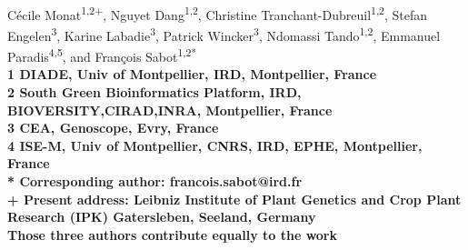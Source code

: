 \documentclass[10pt,letterpaper]{article}
\begin{document}
\vspace*{0.35in}

\begin{flushleft}
{\Large
\textbf{}
}
\newline
\\
Cécile Monat\textsuperscript{1,2{+}\textdagger},
Nguyet Dang\textsuperscript{1,2\textdagger},
Christine Tranchant-Dubreuil\textsuperscript{1,2\textdagger},
Stefan Engelen\textsuperscript{3},
Karine Labadie\textsuperscript{3},
Patrick Wincker\textsuperscript{3},
Ndomassi Tando\textsuperscript{1,2},
Emmanuel Paradis\textsuperscript{4,5},
and François Sabot\textsuperscript{1,2*}
\\
\bigskip
\bf{1} DIADE, Univ of Montpellier, IRD, Montpellier, France
\\
\bf{2} South Green Bioinformatics Platform, IRD, BIOVERSITY,CIRAD,INRA, Montpellier, France
\\
\bf{3} CEA, Genoscope, Evry, France
\\
\bf{4} ISE-M, Univ of Montpellier, CNRS, IRD, EPHE, Montpellier, France
\\
\bigskip
* Corresponding author: francois.sabot@ird.fr\\
{+} Present address: Leibniz Institute of Plant Genetics and Crop Plant Research (IPK) Gatersleben, Seeland, Germany\\
\textdagger Those three authors contribute equally to the work\\
\end{flushleft}
\end{document}

